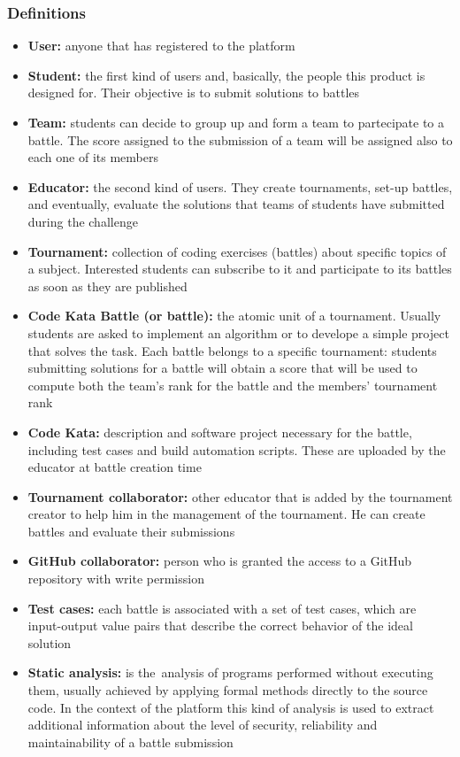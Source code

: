 \subsubsection{Definitions}
\begin{itemize}
    \item {\textbf{User:} anyone that has registered to the platform}
    \item {\textbf{Student:} the first kind of users and, basically, the people this product is designed for. Their objective is to submit solutions to battles}
    \item {\textbf{Team:} students can decide to group up and form a team to partecipate to a battle. The score assigned to the submission of a team will be assigned also to each one of its members}
    \item {\textbf{Educator:} the second kind of users. They create tournaments, set-up battles, and eventually, evaluate the solutions that teams of students have submitted during the challenge}
    \item {\textbf{Tournament:} collection of coding exercises (battles) about specific topics of a subject. Interested students can subscribe to it and participate to its battles as soon as they are published}
    \item {\textbf{Code Kata Battle (or battle):} the atomic unit of a tournament. Usually students are asked to implement an algorithm or to develope a simple project that solves the task. Each battle belongs to a specific tournament: students submitting solutions for a battle will obtain a score that will be used to compute both the team's rank for the battle and the members' tournament rank}
    \item {\textbf{Code Kata:} description and software project necessary for the battle, including test cases and build automation scripts. These are uploaded by the educator at battle creation time}
    \item {\textbf{Tournament collaborator:} other educator that is added by the tournament creator to help him in the management of the tournament. He can create battles and evaluate their submissions}
    \item {\textbf{GitHub collaborator:} person who is granted the access to a GitHub repository with write permission}
    \item {\textbf{Test cases:} each battle is associated with a set of test cases, which  are input-output value pairs that describe the correct behavior of the ideal solution}
    \item {\textbf{Static analysis:} is the analysis of programs performed without executing them, usually achieved by applying formal methods directly to the source code. In the context of the platform this kind of analysis is used to extract additional information about the level of security, reliability and maintainability of a battle submission}

\end{itemize}
